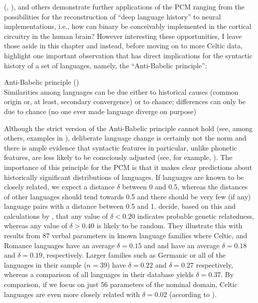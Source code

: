 \documentclass[output=paper,colorlinks,citecolor=brown]{langscibook}
\begin{document}
\noindent \citeauthor{mm:ceolin_formal_2020} (\citeyear{mm:ceolin_formal_2020}, \citeyear{mm:ceolin_at_2021}), \citet{mm:longobardi2023grammatical} and others demonstrate further applications of the PCM ranging from the possibilities for the reconstruction of ``deep language history'' to neural implementations, i.e., how can binary  be conceivably implemented in the cortical circuitry in the human brain? However interesting these opportunities, I leave those aside in this chapter and instead, before moving on to more Celtic data, highlight one important observation that has direct implications for the syntactic history of a set of languages, namely, the “Anti-Babelic principle”:

\eanoraggedright
Anti-Babelic principle (\citealt{mm:guardiano_parametric_2005})\smallskip\\
Similarities among languages can be due either to historical causes (common origin or, at least, secondary convergence) or to chance; differences can only be due to chance (no one ever made language diverge on purpose)
\z

\noindent Although the strict version of the Anti-Babelic principle cannot hold (see, among others, examples in \cite{mm:thomason_language_2007}), deliberate language change is certainly not the norm and there is ample evidence that syntactic features in particular, unlike phonetic features, are less likely to be consciously adjusted (see, for example, \citealt{mm:smith2000synchrony}). The importance of this principle for the PCM is that it makes clear predictions about historically significant distributions of languages. If languages are known to be closely related, we expect a distance $\delta$ between 0 and 0.5, whereas the distances of other languages should tend towards 0.5 and there should be very few (if any) language pairs with a distance between 0.5 and 1. \citet{mm:bakerroberts2024} decide, based on this and calculations by \citet{mm:bortolussi_how_2011}, that any value of $\delta<0.20$ indicates probable genetic relatedness, whereas any value of $\delta>0.40$ is likely to be random. They illustrate this with results from 87 verbal parameters in known language families where Celtic,  and Romance languages have an average $\delta=0.15$ and  and  have an average $\delta=0.18$ and $\delta=0.19$, respectively. Larger families such as Germanic or all of the  languages in their sample ($n=39$) have $\delta=0.22$ and $\delta=0.27$ respectively, whereas a comparison of all languages in their database yields $\delta=0.37$. By comparison, if we focus on just 56 parameters of the nominal domain, Celtic languages are even more closely related with $\delta=0.02$ (according to \cite[257]{mm:longobardi_principles_2017}). 
\end{document}
